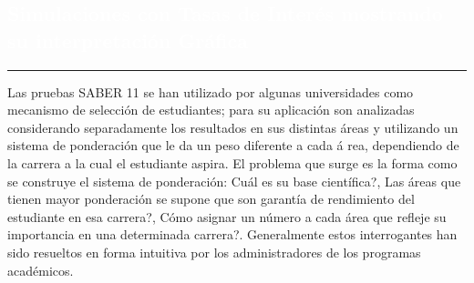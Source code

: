 \begin{titlepage}
\pagecolor{white}
\newcommand{\R}{\ensuremath{\mathbb{R}}}
\BgThispage
{}
\vspace*{-1.1cm}
\noindent
\def\titulo#1{\section{#1}}

\section{\bf\large\textcolor{white}{Simulaciones con Tasas de Inter\'es mostrando su interpretaci\'on Gr\'afica }}
\vspace*{2cm}\par
\noindent

\begin{minipage}{0.5\linewidth}
\begin{minipage}{0.45\linewidth}
    \begin{flushright}
        \printauthor
    \end{flushright}
\end{minipage} \hspace{-3pt}
%
\begin{minipage}{0.02\linewidth}
   \color{ptctitle} \rule{1pt}{225pt}
\end{minipage} 
\end{minipage}
\hspace*{-4.5cm}
%
\begin{minipage}{0.85\linewidth}
\begin{minipage}{0.85\linewidth}
\footnotesize
\vspace{5pt}
    \begin{resumen}
    Las pruebas SABER 11 se han utilizado por algunas universidades como
mecanismo de selecci\'on de estudiantes; para su aplicaci\'on son analizadas
considerando separadamente los resultados en sus distintas \'areas y
utilizando un sistema de ponderaci\'on que le da un peso diferente a cada \'a%
rea, dependiendo de la carrera a la cual el estudiante aspira. El problema
que surge es la forma como se construye el sistema de ponderaci\'on: \textquestiondown Cu\'al es
su base cient\'ifica?, \textquestiondown Las \'areas que tienen mayor ponderaci\'on se supone que
son garant\'ia de rendimiento del estudiante en esa carrera?, \textquestiondown C\'omo asignar un
n\'umero a cada \'area que refleje su importancia en una determinada carrera?.
Generalmente estos interrogantes han sido resueltos en forma intuitiva por
los administradores de los programas acad\'emicos.


\end{resumen}
\end{minipage}
\end{minipage}
\end{titlepage}
